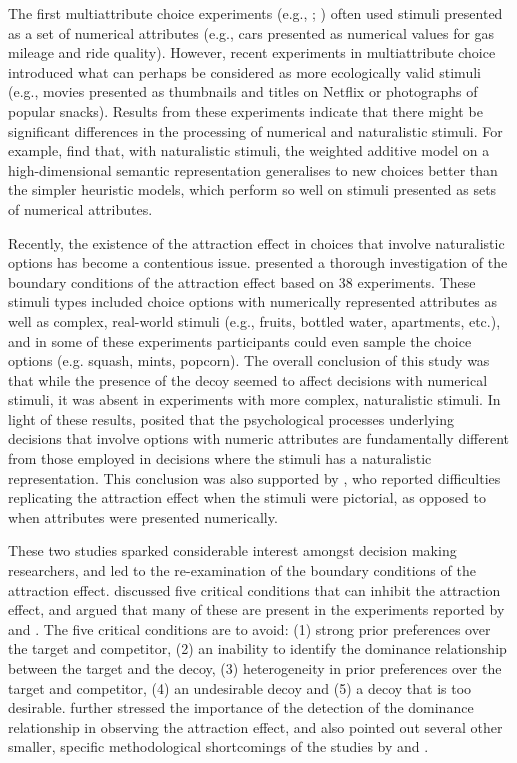 \documentclass[12pt, a4paper]{article}
\begin{document}
The first multiattribute choice experiments (e.g., ; ) often used stimuli presented as a set of numerical attributes (e.g., cars presented as numerical values for gas mileage and ride quality). However, recent experiments in multiattribute choice introduced what can perhaps be considered as more ecologically valid stimuli (e.g., movies presented as thumbnails and titles on Netflix or photographs of popular snacks). Results from these experiments indicate that there might be significant differences in the processing of numerical and naturalistic stimuli. For example,  find that, with naturalistic stimuli, the weighted additive model on a high-dimensional semantic representation generalises to new choices better than the simpler heuristic models, which perform so well on stimuli presented as sets of numerical attributes. 

Recently, the existence of the attraction effect in choices that involve naturalistic options has become a contentious issue.
 presented a thorough investigation of the boundary conditions of the attraction effect based on 38 experiments. These stimuli types included choice options with numerically represented attributes as well as complex, real-world stimuli (e.g., fruits, bottled water, apartments, etc.), and in some of these experiments participants could even sample the choice options (e.g. squash, mints, popcorn). The overall conclusion of this study was that while the presence of the decoy seemed to affect decisions with numerical stimuli, it was absent in experiments with more complex, naturalistic stimuli. In light of these results, \citeauthor{Frederick2014} posited that the psychological processes underlying decisions that involve options with numeric attributes are fundamentally different from those employed in decisions where the stimuli has a naturalistic representation. This conclusion was also supported by , who reported difficulties replicating the attraction effect when the stimuli were pictorial, as opposed to when attributes were presented numerically.

These two studies sparked considerable interest amongst decision making researchers, and led to the re-examination of the boundary conditions of the attraction effect.  discussed five critical conditions that can inhibit the attraction effect, and argued that many of these are present in the experiments reported by \citeauthor{Frederick2014} and \citeauthor{Yang2014}. The five critical conditions are to avoid: (1) strong prior preferences over the target and competitor, (2) an inability to identify the dominance relationship  between the target and the decoy, (3) heterogeneity in prior preferences over the target and competitor, (4) an undesirable decoy and (5) a decoy that is too desirable.  further stressed the importance of the detection of the dominance relationship in observing the attraction effect, and also pointed out several other smaller, specific methodological shortcomings of the studies by \citeauthor{Frederick2014} and \citeauthor{Yang2014}.
\end{document}
